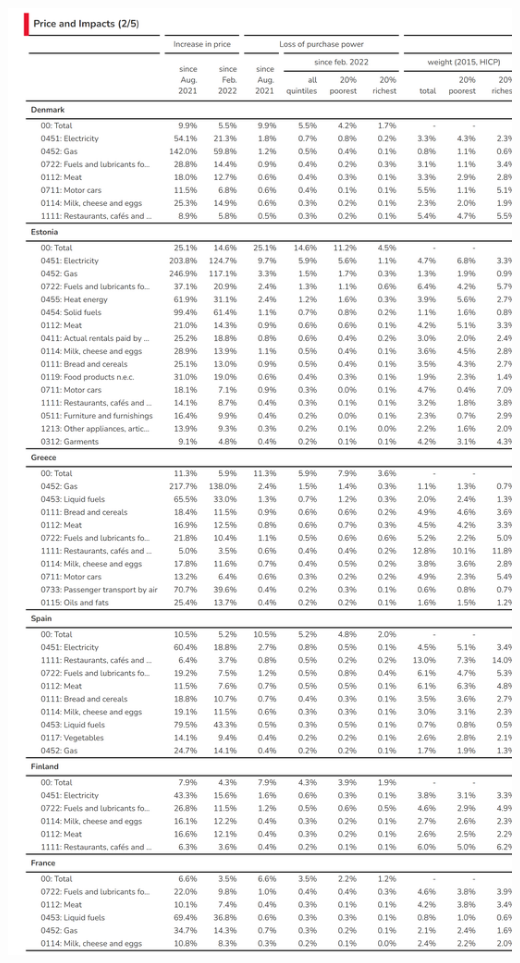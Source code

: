 \documentclass[
  9pt,
  a4paper,
  numbers=noendperiod,
  DIV=12]{scrartcl}
\begin{document}
\includegraphics{../svg/annex_2.png}
\end{document}
